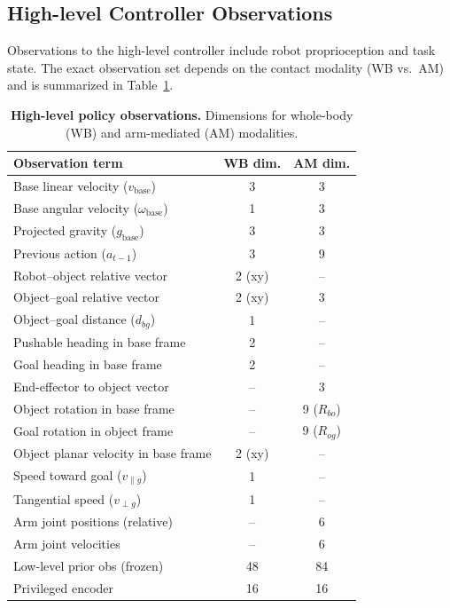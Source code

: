 
\subsection{High-level Controller Observations}
\label{sec:obs}
Observations to the high-level controller include robot proprioception and task state. The exact observation set depends on the contact modality (WB vs.\ AM) and is summarized in Table~\ref{tab:obs_combined}.

\begin{table}[ht]
\centering
\caption{\textbf{High-level policy observations.} Dimensions for whole-body (WB) and arm-mediated (AM) modalities.}
\label{tab:obs_combined}
\scriptsize
\setlength{\tabcolsep}{4pt}
\renewcommand{\arraystretch}{1.08}
\begin{tabular}{lcc}
\toprule
\textbf{Observation term} & \textbf{WB dim.} & \textbf{AM dim.} \\
\midrule
Base linear velocity ($v_{\text{base}}$) & 3 & 3 \\
Base angular velocity ($\omega_{\text{base}}$) & 1 & 3 \\
Projected gravity ($g_{\text{base}}$) & 3 & 3 \\
Previous action ($a_{t-1}$) & 3 & 9 \\
\addlinespace[0.25em]\hline\addlinespace[0.15em]
Robot--object relative vector & 2 (xy) & -- \\
Object--goal relative vector & 2 (xy) & 3 \\
Object--goal distance ($d_{bg}$) & 1 & -- \\
Pushable heading in base frame & 2 & -- \\
Goal heading in base frame & 2 & -- \\
End-effector to object vector & -- & 3 \\
Object rotation in base frame & -- & 9 ($R_{bo}$) \\
Goal rotation in object frame & -- & 9 ($R_{og}$) \\
\addlinespace[0.25em]\hline\addlinespace[0.15em]
Object planar velocity in base frame & 2 (xy) & -- \\
Speed toward goal ($v_{\parallel g}$) & 1 & -- \\
Tangential speed ($v_{\perp g}$) & 1 & -- \\
Arm joint positions (relative) & -- & 6 \\
Arm joint velocities & -- & 6 \\
\addlinespace[0.25em]\hline\addlinespace[0.15em]
Low-level prior obs (frozen) & 48 & 84 \\
Privileged encoder & 16 & 16 \\
\bottomrule
\end{tabular}
\vspace{-0.6em}
\end{table}




